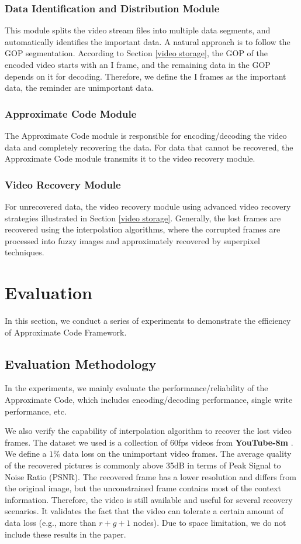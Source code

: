 \documentclass[sigconf]{acmart}
\begin{document}
\subsubsection{Data Identification and Distribution Module}
This module splits the video stream files into multiple data segments, and automatically identifies the important data. A natural approach is to follow the GOP segmentation. According to Section \ref{video storage}, the GOP of the encoded video starts with an I frame, and the remaining data in the GOP depends on it for decoding. Therefore, we define the I frames as the important data, the reminder are unimportant data.

\subsubsection{Approximate Code Module}
The Approximate Code module is responsible for encoding/decoding the video data and completely recovering the data. For data that cannot be recovered, the Approximate Code module transmits it to the video recovery module.

\subsubsection{Video Recovery Module}
For unrecovered data, the video recovery module using advanced video recovery strategies illustrated in Section \ref{video storage}. Generally, the lost frames are recovered using the interpolation algorithms, where the corrupted frames are processed into fuzzy images and approximately recovered by superpixel techniques.


\section{Evaluation}\label{evaluation}
In this section, we conduct a series of experiments to demonstrate the efficiency of Approximate Code Framework.


\subsection{Evaluation Methodology}
In the experiments, we mainly evaluate the performance/reliability of the Approximate Code, which includes encoding/decoding performance, single write performance, etc.

We also verify the capability of interpolation algorithm\cite{meyer2015phase, niklaus2018context,van2017frame} to recover the lost video frames. The dataset we used is a collection of 60fps videos from \textbf{YouTube-8m} \cite{youtube8m}. We define a $1\%$ data loss on the unimportant video frames.
The average quality of the recovered pictures is commonly above 35dB in terms of Peak Signal to Noise Ratio (PSNR). The recovered frame has a lower resolution and differs from the original image, but the unconstrained frame contains most of the context information. Therefore, the video is still available and useful for several recovery scenarios. It validates the fact that the video can tolerate a certain amount of data loss (e.g., more than $r+g+1$ nodes). Due to space limitation, we do not include these results in the paper. 
\end{document}

